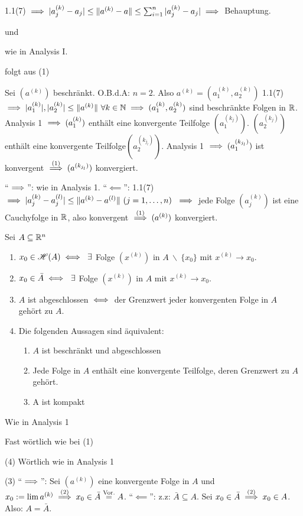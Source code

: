 \documentclass[a4paper,oneside,DIV15,BCOR12mm,chapterprefix=true,headings=onelinechapter]{scrbook}
\begin{document}
\begin{beweise}
  \item 1.1(7) $\implies |a_j^{(k)} - a_j| \le \|a^{(k)}-a\| \le \sum_{i=1}^n|a_j^{(k)} - a_j| \implies $ Behauptung.
  \item und
  \item wie in Analysis I.
  \item folgt aus (1)
  \item Sei $(a^{(k)})$ beschränkt. O.B.d.A: $n=2$. Also $a^{(k)}=(a_1^{(k)},a_2^{(k)})$ 1.1(7) $\implies |a_1^{(k)}|,|a_2^{(k)}|\le\|a^{(k)}\|\ \forall k\in\mathbb{N} \implies (a_1^{(k)},a_2^{(k)})$ sind beschränkte Folgen in $\mathbb{R}$. Analysis 1 $\implies (a_1^{(k)})$ enthält eine konvergente Teilfolge $(a_1^{(k_j)})$. $(a_2^{(k_j)})$ enthält eine konvergente Teilfolge$ (a_2^{(k_{j_l})})$. Analysis 1 $\implies (a_1^{(k_{j_l})})$ ist konvergent $\overset{(1)}{\implies} (a^{(k_{j_l})})$ konvergiert.
  \item "`$\implies$"': wie in Analysis 1. "`$\impliedby$"': 1.1(7) $\implies |a_j^{(k)}-a_j^{(l)}| \le \|a^{(k)}-a^{(l)}\|\ (j=1,\ldots,n)\ \implies$ jede Folge $(a_j^{(k)})$ ist eine Cauchyfolge in $\mathbb{R}$, also konvergent $\overset{(1)}{\implies} (a^{(k)})$ konvergiert.
\end{beweise}

\begin{satz}
Sei $A\subseteq\mathbb{R}^n$
\begin{enumerate}
\item $x_0 \in \mathscr{H}(A)\iff\ \exists$ Folge $(x^{(k)})$ in $A\ \backslash\ \{x_0\}$ mit $x^{(k)}\to x_0$.
\item $x_0 \in \bar A\iff\ \exists$ Folge $(x^{(k)})$ in $A$ mit $x^{(k)}\to x_0$.
\item $A$ ist abgeschlossen $\iff$ der Grenzwert jeder konvergenten Folge in $A$ gehört zu $A$.
\item Die folgenden Aussagen sind äquivalent:
    \begin{enumerate}
        \item $A$ ist beschränkt und abgeschlossen 
        \item Jede Folge in $A$ enthält eine konvergente Teilfolge, deren Grenzwert zu $A$ gehört.
        \item A ist kompakt
    \end{enumerate}
\end{enumerate}
\end{satz}

\begin{beweise}
\item Wie in Analysis 1
\item Fast wörtlich wie bei (1)
\item[(4)] Wörtlich wie in Analysis 1
\item[(3)] "`$\implies$"': Sei $(a^{(k)})$ eine konvergente Folge in $A$ und $x_0:=\lim a^{(k)} \overset{(2)}{\implies} x_0 \in \bar A \overset{\text{Vor.}}{=}A$. "`$\impliedby$"': z.z: $\bar A \subseteq A$. Sei $x_0 \in \bar A \overset{(2)}{\implies}x_0 \in A$. Also: $A=\bar A$.
\end{beweise}
\end{document}
